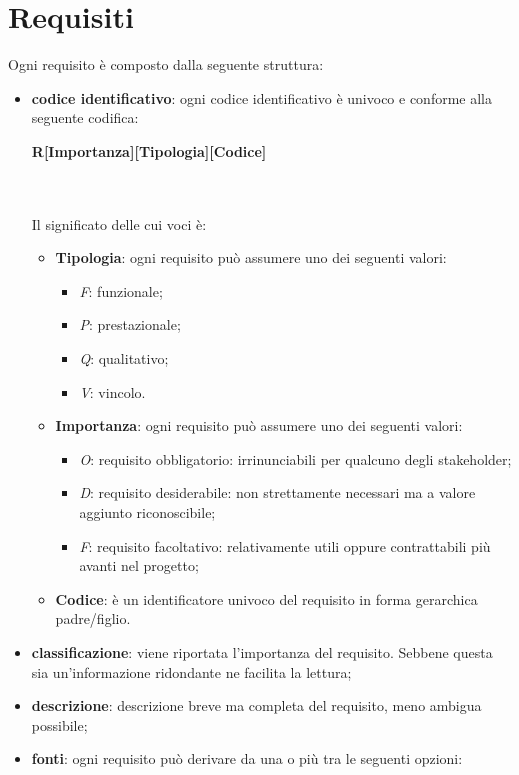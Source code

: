 
\section{Requisiti} 
Ogni requisito è composto dalla seguente struttura:
\begin{itemize}
	\item \textbf{codice identificativo}: ogni codice identificativo è univoco e conforme alla seguente codifica: \\
	\centerline{\textbf{R[Importanza][Tipologia][Codice]}} \\ \\
	Il significato delle cui voci è:
	\begin{itemize}
		\item \textbf{Tipologia}: ogni requisito può assumere uno dei seguenti valori:
		\begin{itemize}
			\item \textit{F}: funzionale;
			\item \textit{P}: prestazionale;
			\item \textit{Q}: qualitativo;
			\item \textit{V}: vincolo.
		\end{itemize}
		\item \textbf{Importanza}: ogni requisito può assumere uno dei seguenti valori:
		\begin{itemize}
			\item \textit{O}: requisito obbligatorio: irrinunciabili per qualcuno degli stakeholder;
			\item \textit{D}: requisito desiderabile: non strettamente necessari ma  a valore aggiunto riconoscibile;
			\item \textit{F}: requisito facoltativo: relativamente utili oppure contrattabili più avanti nel progetto;	
		\end{itemize}
		\item \textbf{Codice}: è un identificatore univoco del requisito in forma gerarchica padre/figlio.
	\end{itemize}
	\item \textbf{classificazione}: viene riportata l'importanza del requisito. Sebbene questa sia un'informazione ridondante ne facilita la lettura;
	\item \textbf{descrizione}: descrizione breve ma completa del requisito, meno ambigua possibile;
	\item \textbf{fonti}: ogni requisito può derivare da una o più tra le seguenti opzioni:
	\begin{itemize}

\end{itemize}
\end{itemize}

